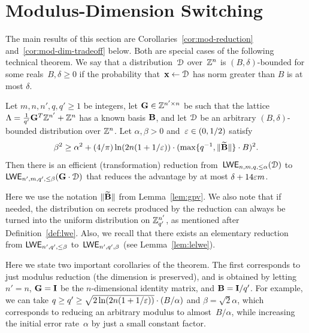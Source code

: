 \section{Modulus-Dimension Switching}
\label{sec:modexpansion}



The main results of this section are Corollaries~\ref{cor:mod-reduction} and~\ref{cor:mod-dim-tradeoff} below.
Both are special cases of the following technical theorem.  
We
say that a distribution~$\mathcal{D}$ over~$\mathbb{Z}^{n}$ is $(B,\delta)$-bounded
for some reals~$B,\delta\geq 0$ if the probability that~$\mathbf{x} \gets
\mathcal{D}$ has norm greater than $B$ is at most $\delta$. 

\begin{theorem}
  \label{thm:mod-dim-switch}
  Let $m,n, n',q,q' \geq 1$ be integers, let
  $\mathbf{G} \in \mathbb{Z}^{n' \times n}$ be such that the lattice $\Lambda =
  \frac{1}{q'} \mathbf{G}^{T} \mathbb{Z}^{n'} + \mathbb{Z}^{n}$ has a known basis $\mathbf{B}$,
  and let $\mathcal{D}$ be an arbitrary $(B,\delta)$-bounded distribution over
  $\mathbb{Z}^{n}$.  Let $\alpha, \beta > 0$ and~$\varepsilon \in (0,1/2)$ satisfy 
	\[\beta^{2} \geq
  \alpha^{2} + (4/\pi) \ln(2n(1+1/\varepsilon)) \cdot (\max\{q^{-1}, \lVert\widetilde{\mathbf{B}}\rVert\} \cdot B)^{2}.\]  
	Then there is an efficient (transformation) reduction
  from~$\mathsf{LWE}_{n,m,q,\le \alpha}(\mathcal{D})$ to $\mathsf{LWE}_{n',m,q',\leq \beta}(\mathbf{G}
  \cdot \mathcal{D})$ that reduces the advantage by at most $\delta + 14 \varepsilon m$.
\end{theorem}

Here we use the notation
$\|\widetilde {\mathbf{B}}\|$ from Lemma~\ref{lem:gpv}. We also note that if needed, the distribution on secrets produced
by the reduction can always be turned into the uniform distribution on $\mathbb{Z}_{q'}^{n'}$, as mentioned after Definition~\ref{def:lwe}.
Also, we recall that there exists an elementary reduction from $\mathsf{LWE}_{n',q',\leq \beta}$ 
to~$\mathsf{LWE}_{n',q',\beta}$ (see Lemma~\ref{lem:lelwe}).

Here we state two important corollaries of the theorem.  The first
corresponds to just modulus reduction (the \lwe dimension is
preserved), and is obtained by letting $n'=n$, $\mathbf{G}=\mathbf{I}$ be the
$n$-dimensional identity matrix, and $\mathbf{B} = \mathbf{I}/q'$.  
For example, we can take $q \ge q' \ge \sqrt{2\ln(2n(1+1/\varepsilon))} \cdot
(B/\alpha)$ and $\beta=\sqrt{2} \alpha$, which corresponds to reducing
an arbitrary modulus to almost~$B/\alpha$, while increasing the
initial error rate~$\alpha$ by just a small constant factor.

